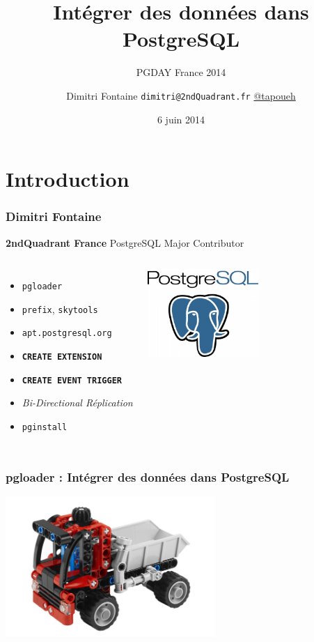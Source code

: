 \documentclass{beamer}
\title{Intégrer des données dans PostgreSQL}
\subtitle{PGDAY France 2014}
\author{Dimitri Fontaine \texttt{dimitri@2ndQuadrant.fr}
  \linebreak
  \url{@tapoueh}}
\date{6 juin 2014}
\begin{document}
\frame{\titlepage}

\section{Introduction}

\begin{frame}[fragile]
  \frametitle{Dimitri Fontaine}

  \begin{center}
    \textbf{2ndQuadrant France}
    \linebreak
    PostgreSQL Major Contributor
  \end{center}

\begin{columns}[c]

  \begin{itemize}
   \item \texttt{pgloader}
   \item \texttt{prefix}, \texttt{skytools}
   \item \texttt{apt.postgresql.org}
   \item \texttt{\textbf{CREATE EXTENSION}}
   \item \texttt{\textbf{CREATE EVENT TRIGGER}}
   \item \textit{Bi-Directional Réplication}
   \item \texttt{pginstall}
  \end{itemize}  

\begin{center}
  \includegraphics[height=9em]{postgres-logo.png}
\end{center}
\end{columns}
\end{frame}

\begin{frame}
  \frametitle{pgloader : Intégrer des données dans PostgreSQL}


  \begin{center}
    \includegraphics[height=2.1in]{pgloader.jpg}
  \end{center}
\end{frame}
\end{document}
